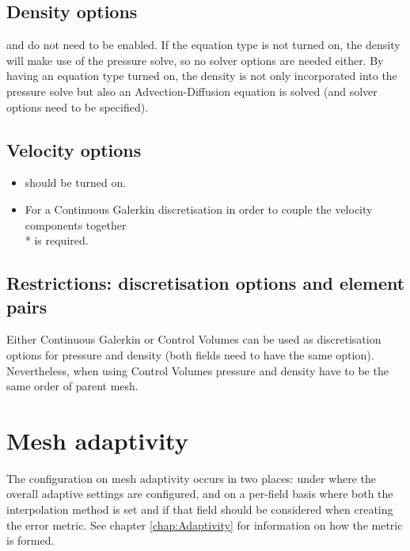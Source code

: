 \subsection{Density options}
 and  do not need to be enabled. If the equation type is not turned on, the density will make 
use of the pressure solve, so no solver options are needed either. By having an equation type turned on, the density is not only incorporated into the pressure solve 
but also an Advection-Diffusion equation is solved (and solver options need to be specified).

\subsection{Velocity options}
\begin{itemize}
\item {} should be turned on.
\item For a Continuous Galerkin discretisation in order to couple the velocity components together \\*  is required.
\end{itemize}

\subsection{Restrictions: discretisation options and element pairs}
Either Continuous Galerkin or Control Volumes can be used as discretisation options for pressure and density (both fields need to have the same option). Nevertheless, 
when using Control Volumes pressure and density have to be the same order of parent mesh.

\section{Mesh adaptivity}

The configuration on mesh adaptivity occurs in two places: under  where 
the overall adaptive settings are configured, and on a per-field basis where both the interpolation
method is set and if that field should be considered when creating the error metric. See chapter 
\ref{chap:Adaptivity} for information on how the metric is formed.


